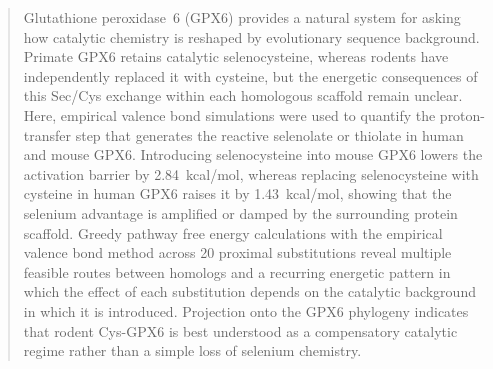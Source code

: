 \begin{abstract}
Glutathione peroxidase~6 (GPX6) provides a natural system for asking how catalytic chemistry is reshaped by evolutionary sequence background. Primate GPX6 retains catalytic selenocysteine, whereas rodents have independently replaced it with cysteine, but the energetic consequences of this Sec/Cys exchange within each homologous scaffold remain unclear. Here, empirical valence bond simulations were used to quantify the proton-transfer step that generates the reactive selenolate or thiolate in human and mouse GPX6. Introducing selenocysteine into mouse GPX6 lowers the activation barrier by 2.84~kcal/mol, whereas replacing selenocysteine with cysteine in human GPX6 raises it by 1.43~kcal/mol, showing that the selenium advantage is amplified or damped by the surrounding protein scaffold. Greedy pathway free energy calculations with the empirical valence bond method across 20 proximal substitutions reveal multiple feasible routes between homologs and a recurring energetic pattern in which the effect of each substitution depends on the catalytic background in which it is introduced. Projection onto the GPX6 phylogeny indicates that rodent Cys-GPX6 is best understood as a compensatory catalytic regime rather than a simple loss of selenium chemistry.
\end{abstract}

